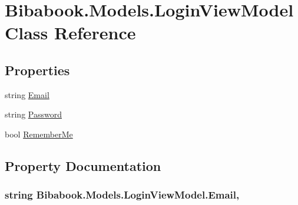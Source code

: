\hypertarget{class_bibabook_1_1_models_1_1_login_view_model}{}\section{Bibabook.\+Models.\+Login\+View\+Model Class Reference}
\label{class_bibabook_1_1_models_1_1_login_view_model}
\subsection*{Properties}
\begin{DoxyCompactItemize}
\item 
string \hyperlink{class_bibabook_1_1_models_1_1_login_view_model_ab99b90f8ca116e3d569022afd3613666}{Email}
\item 
string \hyperlink{class_bibabook_1_1_models_1_1_login_view_model_a4765ab85b0f683bade994ada8dabc686}{Password}
\item 
bool \hyperlink{class_bibabook_1_1_models_1_1_login_view_model_a0e14eda3d537967dce751035608898a6}{Remember\+Me}
\end{DoxyCompactItemize}


\subsection{Property Documentation}
\hypertarget{class_bibabook_1_1_models_1_1_login_view_model_ab99b90f8ca116e3d569022afd3613666}{}
\subsubsection[{Email}]{\setlength{\rightskip}{0pt plus 5cm}string Bibabook.\+Models.\+Login\+View\+Model.\+Email\hspace{0.3cm}{\ttfamily [get]}, {\ttfamily [set]}}\label{class_bibabook_1_1_models_1_1_login_view_model_ab99b90f8ca116e3d569022afd3613666}
\hypertarget{class_bibabook_1_1_models_1_1_login_view_model_a4765ab85b0f683bade994ada8dabc686}{}

